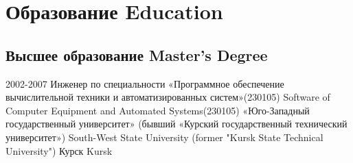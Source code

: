 \section
{\lang
  {Образование}
  {Education}}

\subsection
{\lang
  {Высшее образование}
  {Master's Degree}}

\cventry
{2002-2007}
{\lang
  {Инженер по специальности «Программное обеспечение вычислительной техники и автоматизированных систем»(230105)}
  {Software of Computer Equipment and Automated Systems(230105)}}
{\lang
  {«Юго-Западный государственный университет» (бывший «Курский государственный технический университет»)}
  {South-West State University (former "Kursk State Technical University")}}
{\lang
  {Курск}
  {Kursk}}
{}
{}
